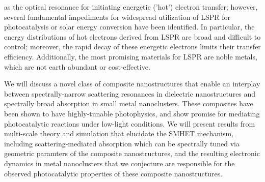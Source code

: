 \documentclass[journal=jacsat,manuscript=article]{achemso}
\begin{document}


as the optical resonance for initiating energetic ('hot') electron transfer; 
however, several fundamental impediments for widespread utilization of LSPR for photocatalysis or solar energy 
conversion have been identified. In particular, the energy distributions of hot electrons derived from LSPR 
are broad and difficult to control; moreover, the rapid decay of these energetic electrons 
limits their transfer efficiency. Additionally, the most promising materials for LSPR are noble metals, 
which are not earth abundant or cost-effective.

We will discuss a novel class of composite nanostructures that enable an interplay between spectrally-narrow scattering resonances in dielectric nanostructures and spectrally broad absorption in small metal nanoclusters. These composites have been shown to have highly-tunable photophysics, and show promise for mediating photocatalytic reactions under low-light conditions. We will present results from multi-scale theory and simulation that elucidate the SMHET mechanism, including scattering-mediated absorption which can be spectrally tuned via geometric paramters of the composite nanostructures, and the resulting electronic dynamics in metal nanoclusters that we conjecture are responsible for the observed photocatalytic properties of these composite nanostructures.
\end{document}

